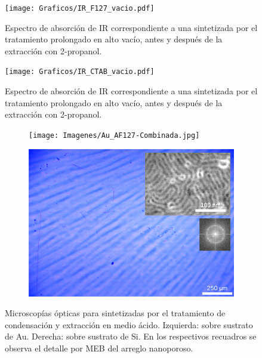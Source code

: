          \begin{figure}
			 	\centering
			 	\texttt{[image: Graficos/IR\_F127\_vacio.pdf]}
			 	\caption[FTIR \pdmF\space tratamiento prolongado.]{Espectro de absorción de IR correspondiente a una \pdmF\space sintetizada por el tratamiento prolongado en alto vacío, antes y después de la extracción con 2-propanol.}
			 	\label{fig:IR_F127_vacio}
			    \end{figure}
					
		 \begin{figure}
			 	\centering
			 	\texttt{[image: Graficos/IR\_CTAB\_vacio.pdf]}
			 	\caption[FTIR \pdmC\space tratamiento prolongado.]{Espectro de absorción de IR correspondiente a una \pdmC\space sintetizada por el tratamiento prolongado en alto vacío, antes y después de la extracción con 2-propanol.}
			 	\label{fig:IR_CTAB_vacio}
			 	\end{figure}

    	
    	
     	     \begin{figure}
	 	   	    \begin{subfigure}{0.49\textwidth}
		       	\texttt{[image: Imagenes/Au\_AF127-Combinada.jpg]}
		   		\end{subfigure}
		   		\begin{subfigure}{0.49\textwidth}
		   	    \includegraphics[width=\textwidth]{Imagenes/Si_AF127-Combinada.jpg}
		   		\end{subfigure}
				 \caption[Microscopía óptica \pdmF tratamiento en medio ácido.]{Microscopías ópticas para \pdmF\space sintetizadas por el tratamiento de condensación y extracción en medio ácido. Izquierda: sobre sustrato de Au. Derecha: sobre sustrato de Si. En los respectivos recuadros se observa el detalle por MEB del arreglo nanoporoso.}
				 \label{fig:Microscopia_F127_acido}	
			     \end{figure}
   		
